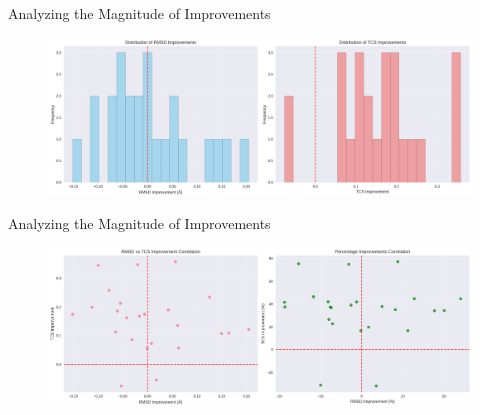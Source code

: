 \documentclass[aspectratio=169]{beamer}
\begin{document}
\begin{frame}{Analyzing the Magnitude of Improvements}
    \begin{figure}
        \includegraphics[width=\textwidth, keepaspectratio]{images/improvement_analysis_1.png}
    \end{figure}
\end{frame}
\begin{frame}{Analyzing the Magnitude of Improvements}
	    \begin{figure}
		\includegraphics[width=\textwidth, keepaspectratio]{images/improvement_analysis_2.png}
	\end{figure}
\end{frame}
\end{document}
